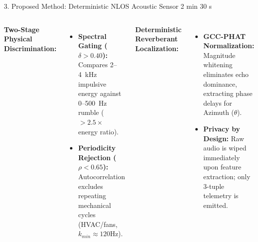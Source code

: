 \documentclass[aspectratio=169,10pt]{beamer}
\begin{document}
\begin{frame}{3. Proposed Method: Deterministic NLOS Acoustic Sensor \hfill {\small\color{gray}2 min 30 s}}
\begin{center}
{
}
\end{center}

\vspace{-0.3em}
\begin{columns}[T]
\textbf{Two-Stage Physical Discrimination:}
\begin{itemize}
    \scriptsize
    \item \textbf{Spectral Gating ($\delta > 0.40$):} Compares 2--4~kHz impulsive energy against 0--500~Hz rumble ($>2.5\times$ energy ratio).
    \item \textbf{Periodicity Rejection ($\rho < 0.65$):} Autocorrelation excludes repeating mechanical cycles (HVAC/fans, $k_{min} \approx 120\text{Hz}$).
\end{itemize}
\textbf{Deterministic Reverberant Localization:}
\begin{itemize}
    \scriptsize
    \item \textbf{GCC-PHAT Normalization:} Magnitude whitening eliminates echo dominance, extracting phase delays for Azimuth ($\theta$).
    \item \textbf{Privacy by Design:} Raw audio is wiped immediately upon feature extraction; only 3-tuple telemetry is emitted.
\end{itemize}
\end{columns}
\end{frame}
\end{document}
